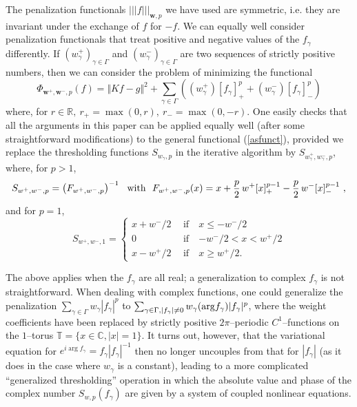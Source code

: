 \documentclass[10pt]{article}
\def\fg{f_{\gamma}}
\newcommand\eref[1]{(\ref{#1})}
\def\Vvert{\vert\!\vert\!\vert}
\begin{document}
The penalization functionals $\Vvert f \Vvert_{\mathbf{w},p}$ we have used are
symmetric, i.e. they are invariant under the exchange of $f$ for $-f$. We can
equally well consider penalization functionals that treat positive and
negative
values of the $\fg$ differently. If $(w^+_\gamma)_{\gamma \in \Gamma}$ and
$(w^-_\gamma)_{\gamma \in \Gamma}$ are two sequences of
strictly positive numbers,
then we can consider the problem of minimizing the functional
\begin{equation}
\label{asfunct}
\Phi_{\mathbf{w}^+, \mathbf{w}^-,p} (f)= \Vert Kf-g\Vert^2 +
\sum_{\gamma \in \Gamma}
((w^+_\gamma) [\fg]_+^p + (w^-_\gamma) [\fg]_-^p)
\end{equation}
where, for $r \in \mathbb{R},~ r_+ = \max(0,r),~ r_- = \max(0,-r)$. One easily
checks that all the arguments in this paper can be applied equally well (after
some straightforward modifications) to the general functional \eref{asfunct},
provided we replace the thresholding functions $S_{w_\gamma,p}$ in the
iterative
algorithm by $S_{w^+_\gamma, w^-_\gamma, p}$, where, for $p>1$,
\begin{equation*}
S_{w^+, w^-, p} = \left( F_{w^+, w^-, p}\right)^{-1}\hbox{\ \ with\ \ }
F_{w^+, w^-, p}(x) = x +\frac{p}{2}\, w^+ [x]_+^{p-1} -
\frac{p}{2}\, w^- [x]_-^{p-1} ~,
\end{equation*}
and for $p=1$,
\begin{equation*}
S_{w^+, w^-, 1} = \left\{
 \begin{array}{ccl} x + w^-/2 ~&~ \mbox{if} ~& x \leq - w^-/2 \\
0 ~&~ \mbox{if} ~& - w^-/2 < x < w^+/2
\\ x- w^+/2 ~&~ \mbox{if} ~& x \geq  w^+/2.
\end{array} \right.
\end{equation*}

The above applies when the $\fg$ are all real; a generalization to complex
$\fg$
is not straightforward. When dealing with complex functions, one could
generalize
the penalization $\sum_{\gamma \in \Gamma} w_\gamma |\fg|^p$ to
$\sum_{\gamma \in \Gamma, |\fg| \neq 0} w_\gamma({\rm arg} \fg) |\fg|^p$,
where the weight coefficients have been replaced by strictly positive
$2\pi$--periodic $C^1$--functions on the $1$--torus $\mathbb{T} =
\{x \in \mathbb{C}, |x|=1\}$.
It turns out, however, that the variational
equation for $e^{i \arg\fg}=\fg |\fg|^{-1}$ then no longer uncouples
from that for $|\fg|$ (as it does in the case where $w_\gamma$ is a constant),
leading to a more complicated ``generalized thresholding'' operation in
which the
absolute value and phase of the complex number $S_{w,p}(\fg)$ are given
by a system of
coupled nonlinear equations.
\end{document}
